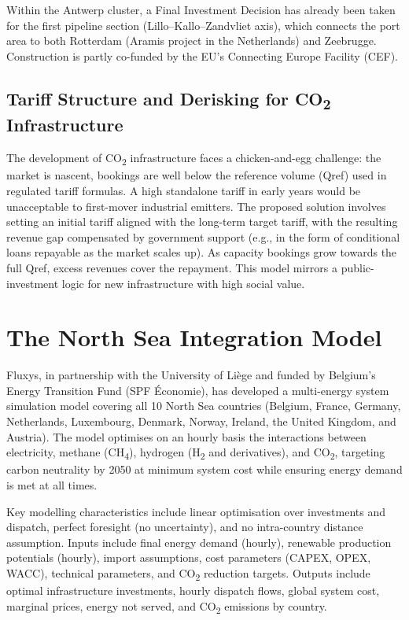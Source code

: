 Within the Antwerp cluster, a Final Investment Decision has already been taken for the first pipeline section (Lillo--Kallo--Zandvliet axis), which connects the port area to both Rotterdam (Aramis project in the Netherlands) and Zeebrugge. Construction is partly co-funded by the EU's Connecting Europe Facility (CEF).

\subsection{Tariff Structure and Derisking for CO\texorpdfstring{\textsubscript{2}}{2} Infrastructure}

The development of CO\textsubscript{2} infrastructure faces a chicken-and-egg challenge: the market is nascent, bookings are well below the reference volume (Qref) used in regulated tariff formulas. A high standalone tariff in early years would be unacceptable to first-mover industrial emitters. The proposed solution involves setting an initial tariff aligned with the long-term target tariff, with the resulting revenue gap compensated by government support (e.g., in the form of conditional loans repayable as the market scales up). As capacity bookings grow towards the full Qref, excess revenues cover the repayment. This model mirrors a public-investment logic for new infrastructure with high social value.

\section{The North Sea Integration Model}

Fluxys, in partnership with the University of Liège and funded by Belgium's Energy Transition Fund (SPF Économie), has developed a multi-energy system simulation model covering all 10 North Sea countries (Belgium, France, Germany, Netherlands, Luxembourg, Denmark, Norway, Ireland, the United Kingdom, and Austria). The model optimises on an hourly basis the interactions between electricity, methane (CH\textsubscript{4}), hydrogen (H\textsubscript{2} and derivatives), and CO\textsubscript{2}, targeting carbon neutrality by 2050 at minimum system cost while ensuring energy demand is met at all times.

Key modelling characteristics include linear optimisation over investments and dispatch, perfect foresight (no uncertainty), and no intra-country distance assumption. Inputs include final energy demand (hourly), renewable production potentials (hourly), import assumptions, cost parameters (CAPEX, OPEX, WACC), technical parameters, and CO\textsubscript{2} reduction targets. Outputs include optimal infrastructure investments, hourly dispatch flows, global system cost, marginal prices, energy not served, and CO\textsubscript{2} emissions by country.

